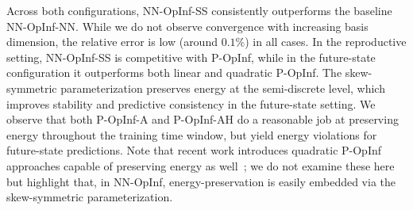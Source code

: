 \documentclass[3p,computermodern,11pt]{elsarticle}
\numberwithin{equation}{section}
\begin{document}
Across both configurations, NN-OpInf-SS consistently outperforms the baseline NN-OpInf-NN. While we do not observe convergence with increasing basis dimension, the relative error is low (around $0.1\%$) in all cases. In the reproductive setting, NN-OpInf-SS is competitive with P-OpInf, while in the future-state configuration it outperforms both linear and quadratic P-OpInf. The skew-symmetric parameterization preserves energy at the semi-discrete level, which improves stability and predictive consistency in the future-state setting. We observe that both P-OpInf-A and P-OpInf-AH do a reasonable job at preserving energy throughout the training time window, but yield energy violations for future-state predictions. Note that recent work introduces quadratic P-OpInf approaches capable of preserving energy as well~\cite{KoQi24,GkDuGo26}; we do not examine these here but highlight that, in NN-OpInf, energy-preservation is easily embedded via the skew-symmetric parameterization.  
\end{document}
